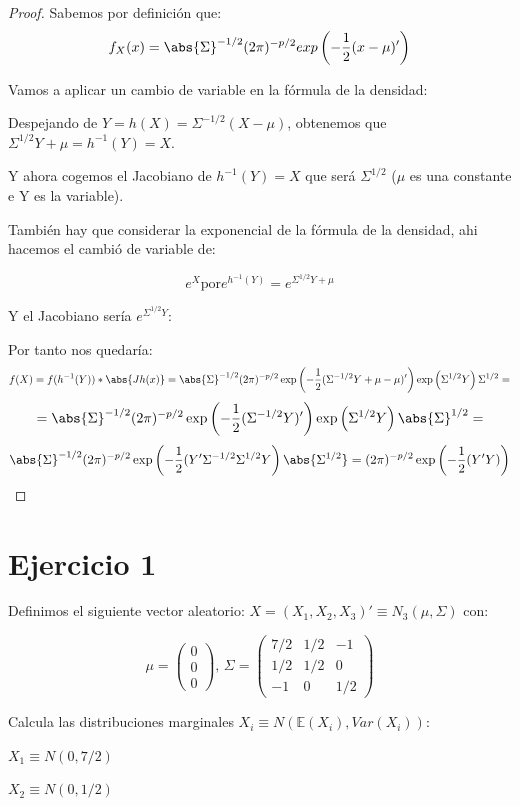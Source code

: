\documentclass[nochap]{apuntes}
\begin{document}
\begin{proof}
Sabemos por definición que:
\[
f_X(x)=\abs{\Sigma}^{-1/2}(2\pi)^{-p/2} exp \left( -\frac{1}{2}(x-\mu)' \right)
\]

Vamos a aplicar un cambio de variable en la fórmula de la densidad:

Despejando de $Y = h(X)= \Sigma^{-1/2}(X-\mu)$, obtenemos que $\Sigma^{1/2}Y+\mu=h^{-1}(Y)=X$.

Y ahora cogemos el Jacobiano de $h^{-1}(Y)=X$ que será $\Sigma^{1/2}$ ($\mu$ es una constante e Y es la variable).

También hay que considerar la exponencial de la fórmula de la densidad, ahi hacemos el cambió de variable de:

$$e^X \text{por} e^{h^{-1}(Y)}=e^{\Sigma^{1/2}Y+\mu}$$

Y el Jacobiano sería $e^{\Sigma^{1/2}Y}$:


Por tanto nos quedaría:
\[
f(X) = f(h^{-1}(Y))*\abs{Jh(x)} = \abs{\Sigma}^{-1/2}(2 \pi)^{-p/2} \exp\left(-\frac{1}{2}(\Sigma^{-1/2}Y+\mu-\mu)'  \right) \exp\left( \Sigma^{1/2}Y \right) \Sigma^{1/2}  =
\]
\[
= \abs{\Sigma}^{-1/2}(2 \pi)^{-p/2} \exp\left(-\frac{1}{2}(\Sigma^{-1/2}Y)' \right) \exp\left( \Sigma^{1/2}Y \right) \abs{\Sigma}^{1/2} =
\]
\[
\abs{\Sigma}^{-1/2}(2 \pi)^{-p/2} \exp\left(-\frac{1}{2}(Y'\Sigma^{-1/2}\Sigma^{1/2}Y \right) \abs{\Sigma^{1/2}} = (2 \pi)^{-p/2} \exp\left(-\frac{1}{2}(Y'Y) \right)
\]
\end{proof}


\section{Ejercicio 1}
Definimos el siguiente vector aleatorio: $X = (X_1,X_2,X_3)' \equiv N_3(\mu, \Sigma)$ con:

\[
\mu=
\left(
\begin{array}{c}
0\\
0\\
0
\end{array}
\right) \text{,       }
\Sigma=
\left(
\begin{array}{ccc}
7/2& 1/2& -1 \\
1/2& 1/2& 0 \\
-1& 0& 1/2
\end{array}
\right)
\]

\ppart Calcula las distribuciones marginales $X_i \equiv N(\mathbb{E}(X_i), Var(X_i))$:

$X_1\equiv N(0, 7/2)$

$X_2\equiv N(0, 1/2)$
\end{document}
